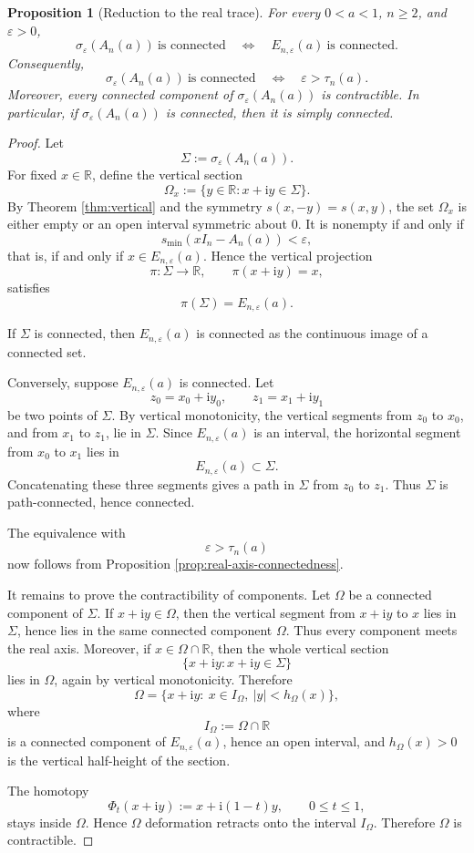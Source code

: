 \documentclass[11pt]{amsart}
\numberwithin{equation}{section}
\newcommand{\R}{\mathbb R}
\newcommand{\eps}{\varepsilon}
\newcommand{\ii}{\mathrm i}
\newtheorem{proposition}[theorem]{Proposition}
\begin{document}
\begin{proposition}[Reduction to the real trace]\label{prop:planar-reduction}
For every \(0<a<1\), \(n\ge2\), and \(\eps>0\),
\[
\sigma_\eps(A_n(a))\ \text{is connected}
\quad\Longleftrightarrow\quad
E_{n,\eps}(a)\ \text{is connected}.
\]
Consequently,
\[
\sigma_\eps(A_n(a))\ \text{is connected}
\quad\Longleftrightarrow\quad
\eps>\tau_n(a).
\]
Moreover, every connected component of \(\sigma_\eps(A_n(a))\) is contractible.  In particular, if \(\sigma_\eps(A_n(a))\) is connected, then it is simply connected.
\end{proposition}

\begin{proof}
Let
\[
\Sigma:=\sigma_\eps(A_n(a)).
\]
For fixed \(x\in\R\), define the vertical section
\[
\Omega_x:=\{y\in\R:x+\ii y\in\Sigma\}.
\]
By Theorem \ref{thm:vertical} and the symmetry \(s(x,-y)=s(x,y)\), the set \(\Omega_x\) is either empty or an open interval symmetric about \(0\).  It is nonempty if and only if
\[
s_{\min}(xI_n-A_n(a))<\eps,
\]
that is, if and only if \(x\in E_{n,\eps}(a)\).  Hence the vertical projection
\[
\pi:\Sigma\to\R,
\qquad
\pi(x+\ii y)=x,
\]
satisfies
\[
\pi(\Sigma)=E_{n,\eps}(a).
\]

If \(\Sigma\) is connected, then \(E_{n,\eps}(a)\) is connected as the continuous image of a connected set.

Conversely, suppose \(E_{n,\eps}(a)\) is connected.  Let
\[
z_0=x_0+\ii y_0,
\qquad
z_1=x_1+\ii y_1
\]
be two points of \(\Sigma\).  By vertical monotonicity, the vertical segments from \(z_0\) to \(x_0\), and from \(x_1\) to \(z_1\), lie in \(\Sigma\).  Since \(E_{n,\eps}(a)\) is an interval, the horizontal segment from \(x_0\) to \(x_1\) lies in
\[
E_{n,\eps}(a)\subset\Sigma.
\]
Concatenating these three segments gives a path in \(\Sigma\) from \(z_0\) to \(z_1\).  Thus \(\Sigma\) is path-connected, hence connected.

The equivalence with
\[
\eps>\tau_n(a)
\]
now follows from Proposition \ref{prop:real-axis-connectedness}.

It remains to prove the contractibility of components.  Let \(\Omega\) be a connected component of \(\Sigma\).  If \(x+\ii y\in\Omega\), then the vertical segment from \(x+\ii y\) to \(x\) lies in \(\Sigma\), hence lies in the same connected component \(\Omega\).  Thus every component meets the real axis.  Moreover, if \(x\in\Omega\cap\R\), then the whole vertical section
\[
\{x+\ii y:x+\ii y\in\Sigma\}
\]
lies in \(\Omega\), again by vertical monotonicity.  Therefore
\[
\Omega
=
\{x+\ii y:\ x\in I_\Omega,\ |y|<h_\Omega(x)\},
\]
where
\[
I_\Omega:=\Omega\cap\R
\]
is a connected component of \(E_{n,\eps}(a)\), hence an open interval, and \(h_\Omega(x)>0\) is the vertical half-height of the section.

The homotopy
\[
\Phi_t(x+\ii y):=x+\ii(1-t)y,
\qquad
0\le t\le1,
\]
stays inside \(\Omega\).  Hence \(\Omega\) deformation retracts onto the interval \(I_\Omega\).  Therefore \(\Omega\) is contractible.
\end{proof}
\end{document}
